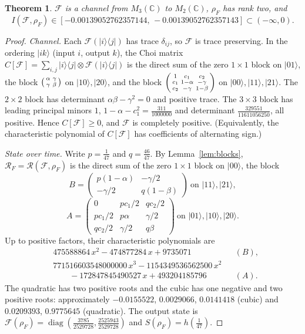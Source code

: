\documentclass[11pt,a4paper]{article}
\newtheorem{theorem}{Theorem}[section]
\theoremstyle{definition}\newtheorem{definition}[theorem]{Definition}
\theoremstyle{remark}\newtheorem{remark}[theorem]{Remark}
\newcommand{\diag}{\operatorname{diag}}
\newcommand{\ket}[1]{\lvert #1\rangle}
\newcommand{\bra}[1]{\langle #1\rvert}
\newcommand{\F}{\mathcal F}
\newcommand{\R}{\mathcal R}
\begin{document}
\begin{theorem}\label{thm:qubitout}
$\F$ is a channel from $M_3(\mathbb C)$ to $M_2(\mathbb C)$, $\rho_F$ has rank two, and
\[
 I(\F,\rho_F)\in[-0.00139052762357144,\,-0.00139052762357143]\subset(-\infty,0).
\]
\end{theorem}
\begin{proof}
\emph{Channel.} Each $\F(\ket i\bra j)$ has trace $\delta_{ij}$, so $\F$ is trace preserving. In the ordering $\ket{ik}$ (input $i$, output $k$), the Choi matrix $C[\F]=\sum_{i,j}\ket i\bra j\otimes\F(\ket i\bra j)$ is the direct sum of the zero $1\times1$ block on $\ket{01}$, the block $\begin{psmallmatrix}\alpha&\gamma\\\gamma&\beta\end{psmallmatrix}$ on $\ket{10},\ket{20}$, and the block
$\begin{psmallmatrix}1&c_1&c_2\\c_1&1-\alpha&-\gamma\\c_2&-\gamma&1-\beta\end{psmallmatrix}$
on $\ket{00},\ket{11},\ket{21}$. The $2\times2$ block has determinant $\alpha\beta-\gamma^2=0$ and positive trace. The $3\times3$ block has leading principal minors $1$, $1-\alpha-c_1^2=\tfrac{311}{1000000}$ and determinant $\tfrac{329551}{11611056250}$, all positive. Hence $C[\F]\ge0$, and $\F$ is completely positive. (Equivalently, the characteristic polynomial of $C[\F]$ has coefficients of alternating sign.)

\emph{State over time.} Write $p=\tfrac1{47}$ and $q=\tfrac{46}{47}$. By Lemma~\ref{lem:blocks}, $\R_F=\R(\F,\rho_F)$ is the direct sum of the zero $1\times1$ block on $\ket{00}$, the block
\[
 B=\begin{pmatrix}p(1-\alpha)&-\gamma/2\\-\gamma/2&q(1-\beta)\end{pmatrix}\ \text{on }\ket{11},\ket{21},
\]
\[
 A=\begin{pmatrix}0&pc_1/2&qc_2/2\\pc_1/2&p\alpha&\gamma/2\\qc_2/2&\gamma/2&q\beta\end{pmatrix}\ \text{on }\ket{01},\ket{10},\ket{20}.
\]
Up to positive factors, their characteristic polynomials are
\begin{align*}
 &475588864\,x^2-474877284\,x+9735071 &&(B),\\
 &771516603548000000\,x^3-1154349536562500\,x^2\\
 &\qquad-172847845490527\,x+493204185796 &&(A).
\end{align*}
The quadratic has two positive roots and the cubic has one negative and two positive roots: approximately $-0.0155522$, $0.0029066$, $0.0141418$ (cubic) and $0.0209393$, $0.9775645$ (quadratic). The output state is $\F(\rho_F)=\diag(\tfrac{3785}{2529728},\tfrac{2525943}{2529728})$ and $S(\rho_F)=h(\tfrac1{47})$.


\end{proof}
\end{document}
